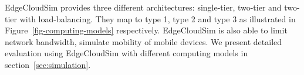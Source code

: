 EdgeCloudSim provides three different architectures: single-tier, two-tier and two-tier with load-balancing.
They map to type 1, type 2 and type 3 as illustrated in Figure~\ref{fig-computing-models} respectively.
EdgeCloudSim is also able to limit network bandwidth, simulate mobility of mobile devices.
We present detailed evaluation using EdgeCloudSim with different computing models in section~\ref{sec:simulation}.
